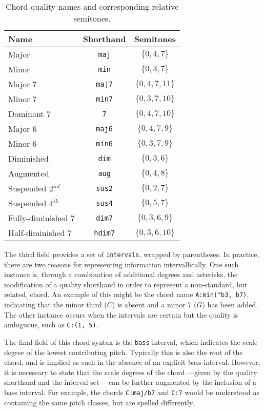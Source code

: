 \begin{table}[h]
\begin{center}
\caption{Chord quality names and corresponding relative semitones.}
\label{tab:qualities}
\begin{tabular}{l | c | c}
Name & Shorthand & Semitones \\
\hline
Major & \texttt{maj} & $\{0, 4, 7\}$ \\
Minor & \texttt{min} & $\{0, 3, 7\}$ \\
Major 7 & \texttt{maj7} & $\{0, 4, 7, 11\}$ \\
Minor 7 & \texttt{min7} & $\{0, 3, 7, 10\}$ \\
Dominant 7 & \texttt{7} & $\{0, 4, 7, 10\}$ \\
Major 6 & \texttt{maj6} & $\{0, 4, 7, 9\}$ \\
Minor 6 & \texttt{min6} & $\{0, 3, 7, 9\}$ \\
Diminished & \texttt{dim} & $\{0, 3, 6\}$ \\
Augmented & \texttt{aug} & $\{0, 4, 8\}$ \\
Suspended 2$^{nd}$ & \texttt{sus2} & $\{0, 2, 7\}$ \\
Suspended 4$^{th}$ & \texttt{sus4} & $\{0, 5, 7\}$ \\
Fully-diminished 7 & \texttt{dim7} & $\{0, 3, 6, 9\}$ \\
Half-diminished 7 & \texttt{hdim7} & $\{0, 3, 6, 10\}$ \\
\hline
\end{tabular}
\end{center}
\end{table}


The third field provides a set of \texttt{intervals}, wrapped by parentheses.
In practice, there are two reasons for representing information intervallically.
One such instance is, through a combination of additional degrees and asterisks, the modification of a quality shorthand in order to represent a non-standard, but related, chord.
An example of this might be the chord name \texttt{A:min($\ast$b3, b7)}, indicating that the minor third ($C$) is absent and a minor 7 ($G$) has been added.
The other instance occurs when the intervals are certain but the quality is ambiguous, such as \texttt{C:(1, 5)}. %

The final field of this chord syntax is the \texttt{bass} interval, which indicates the scale degree of the lowest contributing pitch.
Typically this is also the root of the chord, and is implied as such in the absence of an explicit bass interval.
However, it is necessary to state that the scale degrees of the chord ---given by the quality shorthand and the interval set--- can be further augmented by the inclusion of a bass interval.
For example, the chords \texttt{C:maj/b7} and \texttt{C:7} would be understood as containing the same pitch classes, but are spelled differently.


